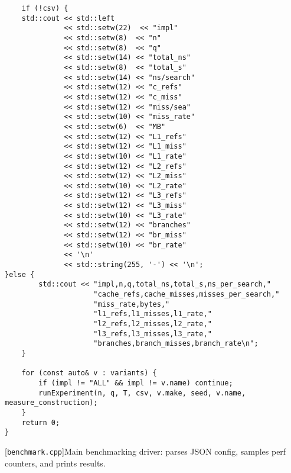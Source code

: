 \begin{lstlisting}
    if (!csv) {
    std::cout << std::left
              << std::setw(22)  << "impl"
              << std::setw(8)  << "n"
              << std::setw(8)  << "q"
              << std::setw(14) << "total_ns"
              << std::setw(8)  << "total_s"
              << std::setw(14) << "ns/search"
              << std::setw(12) << "c_refs"
              << std::setw(12) << "c_miss"
              << std::setw(12) << "miss/sea"
              << std::setw(10) << "miss_rate"
              << std::setw(6)  << "MB"
              << std::setw(12) << "L1_refs"
              << std::setw(12) << "L1_miss"
              << std::setw(10) << "L1_rate"
              << std::setw(12) << "L2_refs"
              << std::setw(12) << "L2_miss"
              << std::setw(10) << "L2_rate"
              << std::setw(12) << "L3_refs"
              << std::setw(12) << "L3_miss"
              << std::setw(10) << "L3_rate"
              << std::setw(12) << "branches"
              << std::setw(12) << "br_miss"
              << std::setw(10) << "br_rate"
              << '\n'
              << std::string(255, '-') << '\n';
}else {
        std::cout << "impl,n,q,total_ns,total_s,ns_per_search,"
                     "cache_refs,cache_misses,misses_per_search,"
                     "miss_rate,bytes,"
                     "l1_refs,l1_misses,l1_rate,"
                     "l2_refs,l2_misses,l2_rate,"
                     "l3_refs,l3_misses,l3_rate,"
                     "branches,branch_misses,branch_rate\n";
    }

    for (const auto& v : variants) {
        if (impl != "ALL" && impl != v.name) continue;
        runExperiment(n, q, T, csv, v.make, seed, v.name, measure_construction);
    }
    return 0;
}

\end{lstlisting}
[\texttt{benchmark.cpp}]{Main benchmarking driver:
parses JSON config, samples perf counters, and prints results.}
\label{lst:src-benchmark-cpp}



